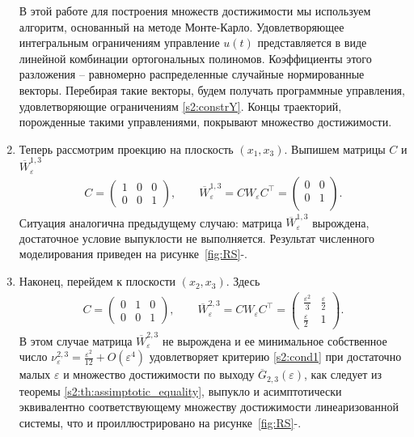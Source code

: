 \documentclass[../main.tex]{subfiles}
\begin{document}
\begin{enumerate}
        В этой работе для построения множеств достижимости мы используем алгоритм, основанный на методе Монте-Карло. 
        Удовлетворяющее интегральным ограничениям управление $ u(t) $ представляется в виде линейной комбинации ортогональных полиномов. 
Коэффициенты этого разложения -- равномерно распределенные случайные нормированные векторы. 
Перебирая такие векторы, будем получать программные управления, удовлетворяющие ограничениям \eqref{s2:constrY}. 
Концы траекторий, порожденные такими управлениями, покрывают множество достижимости.
        
        
        \item Теперь рассмотрим проекцию на плоскость $ (x_1, x_3) $. 
Выпишем матрицы $ C $ и $ \overline{W}_{\varepsilon}^{1,3} $
        \begin{gather*}
            C = \begin{pmatrix}
                1 & 0 & 0 \\
                0 & 0 & 1
            \end{pmatrix}, \qquad
            \overline{W}_{\varepsilon}^{1,3} =  C W_{\varepsilon} C^{\top}  =\begin{pmatrix}
                0 & 0 \\
                0 & 1 \\
            \end{pmatrix} .
        \end{gather*}
        Ситуация аналогична предыдущему случаю: матрица $ \overline{W}_{\varepsilon}^{1,3}  $ вырождена, достаточное условие выпуклости не выполняется. 
Результат численного моделирования приведен на рисунке~\ref{fig:RS}-.
        \item Наконец, перейдем к плоскости $ (x_2, x_3) $. 
Здесь
        \begin{gather*}
            C = \begin{pmatrix}
                0 & 1 & 0 \\
                0 & 0 & 1
            \end{pmatrix}, \qquad \overline{W}_{\varepsilon}^{2,3} =  C W_{\varepsilon} C^{\top}  =\begin{pmatrix}
                \frac{\varepsilon^2}{3} & \frac{\varepsilon}{2} \\
                \frac{\varepsilon}{2} & 1
            \end{pmatrix}.
        \end{gather*}
        В этом случае матрица $ \overline{W}_{\varepsilon}^{2,3} $ не вырождена и ее минимальное собственное число $ \nu^{2,3}_{\varepsilon} = \frac{\varepsilon^2}{12} + O(\varepsilon^4)  $ удовлетворяет критерию \eqref{s2:cond1} при достаточно малых $ \varepsilon $ и множество достижимости по выходу $ \overline{G}_{2,3}(\varepsilon) $, как следует из теоремы \ref{s2:th:assimptotic_equality}, выпукло и асимптотически эквивалентно соответствующему множеству достижимости линеаризованной системы, что и проиллюстрировано на рисунке~\ref{fig:RS}-. 

\end{enumerate}
\end{document}
